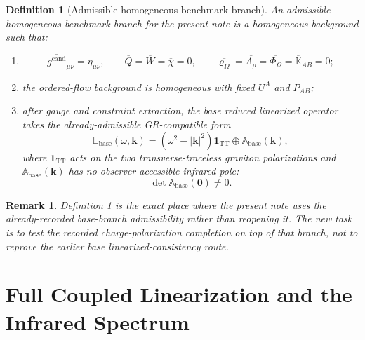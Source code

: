 \documentclass[11pt]{article}
\newcommand{\ProjSub}{P}
\newcommand{\CandidateMetric}{g^{\mathrm{cand}}}
\newcommand{\AuxPol}{\mathbb K}
\newcommand{\FlowPot}{\Phi_\Omega}
\newcommand{\SourceDensity}{\varrho_\Omega}
\newcommand{\SourceMult}{\Lambda_\rho}
\newcommand{\BaseEll}{\mathbb A_{\mathrm{base}}}
\newcommand{\TT}{\mathrm{TT}}
\newtheorem{definition}{Definition}
\newtheorem{remark}{Remark}
\begin{document}
\begin{definition}[Admissible homogeneous benchmark branch]
\label{def:branch}
An \emph{admissible homogeneous benchmark branch} for the present note is a homogeneous background such that:
\begin{enumerate}
    \item
    \begin{equation}
    \overline{\CandidateMetric}_{\mu\nu}=\eta_{\mu\nu},
    \qquad
    \overline Q=\overline W=\overline\chi=0,
    \qquad
    \overline{\SourceDensity}
    =
    \overline{\SourceMult}
    =
    \overline{\FlowPot}
    =
    \overline{\AuxPol}_{AB}
    =0;
    \label{eq:branchdata}
    \end{equation}
    \item the ordered-flow background is homogeneous with fixed \(U^A\) and \(\ProjSub_{AB}\);
    \item after gauge and constraint extraction, the base reduced linearized operator takes the already-admissible GR-compatible form
    \begin{equation}
    \mathbb L_{\mathrm{base}}(\omega,\mathbf{k})
    =
    (\omega^2-|\mathbf{k}|^2)\mathbf 1_{\TT}
    \oplus
    \BaseEll(\mathbf{k}),
    \label{eq:baseoperator}
    \end{equation}
    where \(\mathbf 1_{\TT}\) acts on the two transverse-traceless graviton polarizations and \(\BaseEll(\mathbf{k})\) has no observer-accessible infrared pole:
    \begin{equation}
    \det \BaseEll(\mathbf{0})\neq 0.
    \label{eq:baseinvertible}
    \end{equation}
\end{enumerate}
\end{definition}

\begin{remark}
Definition \ref{def:branch} is the exact place where the present note uses the already-recorded base-branch admissibility rather than reopening it. The new task is to test the recorded charge-polarization completion on top of that branch, not to reprove the earlier base linearized-consistency route.
\end{remark}

\section{Full Coupled Linearization and the Infrared Spectrum}
\end{document}
